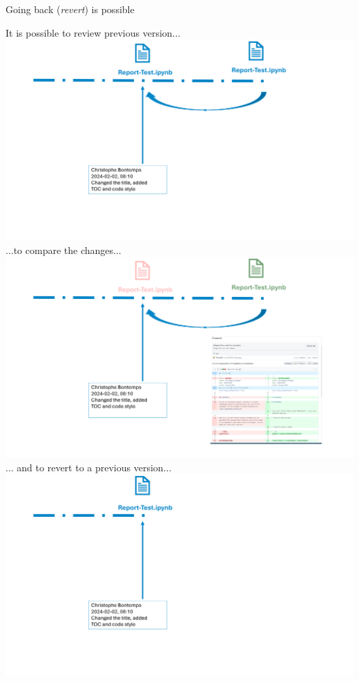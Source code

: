 \documentclass[xcolor=x11names,compress]{beamer}
\renewcommand{\(}{\begin{columns}}
\renewcommand{\)}{\end{columns}}
\newcommand{\<}[1]{\begin{column}{#1}}
\renewcommand{\>}{\end{column}}
\begin{document}
\begin{frame}{Going back (\emph{revert}) is possible}
\begin{center}
\begin{itemize}
    {It is possible to review previous version... \\ }
    {\includegraphics[width = 1.0\textwidth]{FileLifeBack.png} \\ }
    {...to compare the changes...  }
    {\includegraphics[width = 1.0\textwidth]{FileLifeDiff.png} \\ }
    {... and to revert  to a  previous version... }
    {\includegraphics[width = 1.0\textwidth]{FileLifeRevert.png} \\ }

\end{itemize}
\end{center}
\end{frame}
\end{document}
